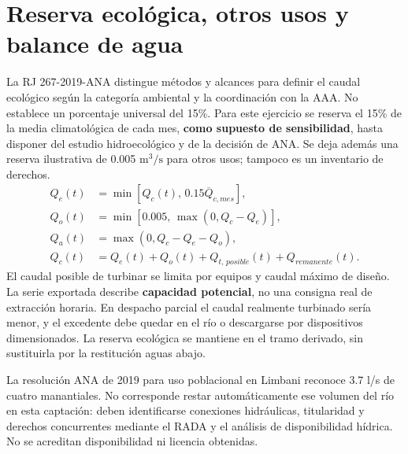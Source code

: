 \section{Reserva ecológica, otros usos y balance de agua}
La RJ 267-2019-ANA distingue métodos y alcances para definir el caudal ecológico según la categoría ambiental y la coordinación con la AAA. No establece un porcentaje universal del 15\%. Para este ejercicio se reserva el 15\% de la media climatológica de cada mes, \textbf{como supuesto de sensibilidad}, hasta disponer del estudio hidroecológico y de la decisión de ANA. Se deja además una reserva ilustrativa de 0.005 \(\mathrm{m^3/s}\) para otros usos; tampoco es un inventario de derechos.
\begin{align}
 Q_e(t)&=\min[Q_c(t),\,0.15\overline{Q}_{c,mes}],\\
 Q_o(t)&=\min[0.005,\,\max(0,Q_c-Q_e)],\\
 Q_a(t)&=\max(0,Q_c-Q_e-Q_o),\\
 Q_c(t)&=Q_e(t)+Q_o(t)+Q_{t,\,posible}(t)+Q_{remanente}(t).
\end{align}
El caudal posible de turbinar se limita por equipos y caudal máximo de diseño. La serie exportada describe \textbf{capacidad potencial}, no una consigna real de extracción horaria. En despacho parcial el caudal realmente turbinado sería menor, y el excedente debe quedar en el río o descargarse por dispositivos dimensionados. La reserva ecológica se mantiene en el tramo derivado, sin sustituirla por la restitución aguas abajo.

La resolución ANA de 2019 para uso poblacional en Limbani reconoce 3.7 l/s de cuatro manantiales. No corresponde restar automáticamente ese volumen del río en esta captación: deben identificarse conexiones hidráulicas, titularidad y derechos concurrentes mediante el RADA y el análisis de disponibilidad hídrica. No se acreditan disponibilidad ni licencia obtenidas.

